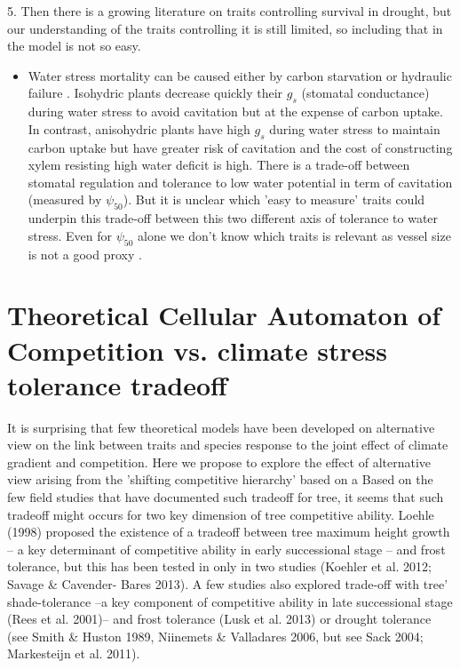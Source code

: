 \documentclass[a4paper,11pt]{article}
\begin{document}
5. Then there is a growing literature on traits controlling survival in drought, but our understanding of the traits controlling it is still limited, so including that in the model is not so easy.

\begin{itemize}
\item Water stress mortality can be caused either by carbon starvation or hydraulic failure \citep{McDowell-2008,McDowell-2011,Skelton-2015}. Isohydric plants decrease quickly their $g_s$ (stomatal conductance) during water stress to avoid cavitation but at the expense of carbon uptake. In contrast, anisohydric plants have high $g_s$ during water stress to maintain carbon uptake but have greater risk of cavitation and the cost of constructing xylem resisting high water deficit is high. There is a trade-off between stomatal regulation and tolerance to low water potential in term of cavitation (measured by $\psi_{50}$). But it is unclear which 'easy to measure' traits could underpin this trade-off between this two different axis of tolerance to water stress. Even for $\psi_{50}$ alone we don't know which traits is relevant as vessel size is not a good proxy \citep{Maherali-2004}.
\end{itemize}



\clearpage

\section{Theoretical Cellular Automaton of Competition vs. climate stress tolerance tradeoff}

It is surprising that few theoretical models have been developed on alternative view on the link between traits and species response to the joint effect of climate gradient and competition.
Here we propose to explore the effect of alternative view arising from the 'shifting competitive hierarchy' based on a
Based on the few field studies that have documented such tradeoff for tree, it seems that such tradeoff might occurs for two key dimension of tree competitive ability. Loehle (1998) proposed the existence of a tradeoff between tree maximum height growth – a key determinant of competitive ability in early successional stage – and frost tolerance, but this has been tested in only in two studies (Koehler et al. 2012; Savage \& Cavender- Bares 2013). A few studies also explored trade-off with tree’ shade-tolerance –a key component of competitive ability in late successional stage (Rees et al. 2001)– and frost tolerance (Lusk et al. 2013) or drought tolerance (see Smith \& Huston 1989, Niinemets \& Valladares 2006, but see Sack 2004; Markesteijn et al. 2011).
\end{document}

